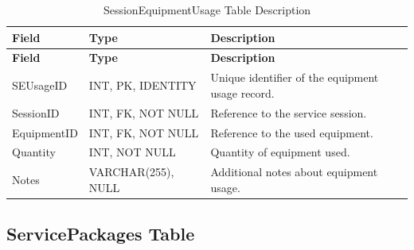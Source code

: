 \begin{longtable}{
		|>{\raggedright\arraybackslash}p{3.2cm}|
		>{\raggedright\arraybackslash}p{4.2cm}|
		>{\raggedright\arraybackslash}p{5.0cm}|
	}
	\caption{SessionEquipmentUsage Table Description}
	\label{tab:session-equipment-usage}\\
	\hline
	\textbf{Field} & \textbf{Type} & \textbf{Description} \\ \hline
	\endfirsthead
	\hline
	\textbf{Field} & \textbf{Type} & \textbf{Description} \\ \hline
	\endhead
	
	SEUsageID & INT, PK, IDENTITY &
	Unique identifier of the equipment usage record. \\ \hline
	
	SessionID & INT, FK, NOT NULL &
	Reference to the service session. \\ \hline
	
	EquipmentID & INT, FK, NOT NULL &
	Reference to the used equipment. \\ \hline
	
	Quantity & INT, NOT NULL &
	Quantity of equipment used. \\ \hline
	
	Notes & VARCHAR(255), NULL &
	Additional notes about equipment usage. \\ \hline
	
\end{longtable}


\subsection{ServicePackages Table}

